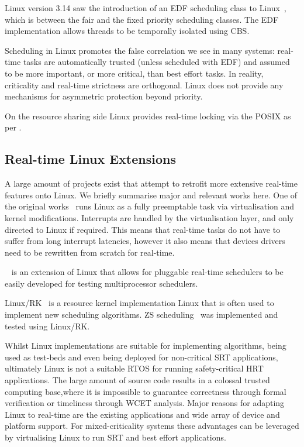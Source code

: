 Linux version 3.14 saw the introduction of an \gls{EDF} scheduling class to Linux~\citep{Corbet_09},
which is between the fair and the fixed priority scheduling classes.  The \gls{EDF} implementation
allows threads to be temporally isolated using \gls{CBS}.

Scheduling in Linux promotes the false correlation we see in many systems: real-time tasks are
automatically trusted (unless scheduled with \gls{EDF}) and assumed to be more important, or more
critical, than best effort tasks.  In reality, criticality and real-time strictness are orthogonal.
Linux does not provide any mechanisms for asymmetric protection beyond priority.

On the resource sharing side Linux provides real-time locking via the POSIX  as per
.
 
\subsection{Real-time Linux Extensions}

A large amount of projects exist that attempt to retrofit more extensive real-time features onto
Linux.  We briefly summarise major and relevant works here.  One of the original
works~\citep{Yodaiken_Barabanov_97} runs Linux as a fully preemptable task via virtualisation and
kernel modifications.  Interrupts are handled by the virtualisation layer, and only directed to
Linux if required.  This means that real-time tasks do not have to suffer from long interrupt
latencies, however it also means that devices drivers need to be rewritten from scratch for
real-time.

\litmus~\citep{Calandrino_LBDA_07} is an extension of Linux that allows for pluggable real-time
schedulers to be easily developed for testing multiprocessor schedulers.

Linux/RK~\citep{Oikawa_Rajkumar_98} is a resource kernel implementation Linux that is often used to
implement new scheduling algorithms.  \gls{ZS} scheduling~\citep{deNiz_LR_09} was implemented and
tested using Linux/RK.

Whilst Linux implementations are suitable for implementing algorithms, being used as test-beds and
even being deployed for non-critical \gls{SRT} applications, ultimately Linux is not a suitable
\gls{RTOS} for running safety-critical \gls{HRT} applications. The large amount of source code
results in a colossal trusted computing base,where it is impossible to guarantee correctness through
formal verification or timeliness through {\gls{WCET}} analysis.  Major reasons for adapting Linux
to real-time are the existing applications and wide array of device and platform support. For
mixed-criticality systems these advantages can be leveraged by virtualising Linux to run \gls{SRT}
and best effort applications.


